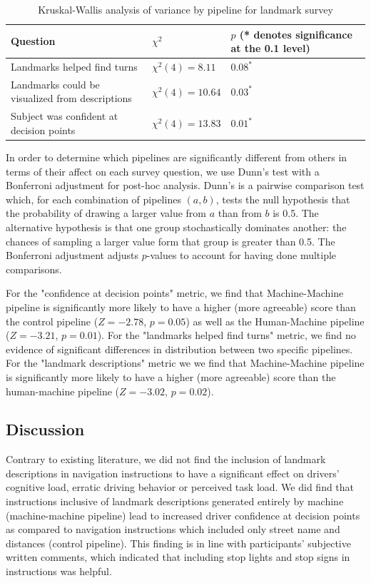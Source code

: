 \begin{table}[htbp]
  \centering
  \caption{Kruskal-Wallis analysis of variance by pipeline for landmark survey}
  \label{tab:likert}
  {\tabulinesep=2mm
    \begin{singlespace}
    \begin{tabu} to \textwidth{|X[c]|X[c]|X[c]|}
        \hline
         Question & $\chi^2$ & $p$ (* denotes significance at the 0.1 level) \\
        \hline\hline
        Landmarks helped find turns & $\chi^2(4) = 8.11$ & $0.08^*$ \\
        \hline
        Landmarks could be visualized from descriptions & $\chi^2(4) = 10.64$ & $0.03^*$ \\
        \hline
        Subject was confident at decision points & $\chi^2(4) = 13.83$ & $0.01^*$ \\
    \hline
    \end{tabu}
    \end{singlespace}
    }
\end{table}

In order to determine which pipelines are significantly different from others in terms of their affect on each survey question, we use Dunn's test with a Bonferroni adjustment for post-hoc analysis. Dunn's is a pairwise comparison test which, for each combination of pipelines $(a, b)$, tests the null hypothesis that the probability of drawing a larger value from $a$ than from $b$ is 0.5. The alternative hypothesis is that one group stochastically dominates another: the chances of sampling a larger value form that group is greater than 0.5. The Bonferroni adjustment adjusts $p$-values to account for having done multiple comparisons.

For the "confidence at decision points" metric, we find that Machine-Machine pipeline is significantly more likely to have a higher (more agreeable) score than the control pipeline ($Z=-2.78$, $p=0.05$) as well as the Human-Machine pipeline ($Z=-3.21$, $p=0.01$). For the "landmarks helped find turns" metric, we find no evidence of significant differences in distribution between two specific pipelines. For the "landmark descriptions" metric we we find that Machine-Machine pipeline is significantly more likely to have a higher (more agreeable) score than the human-machine pipeline ($Z=-3.02$, $p=0.02$).

\subsection{Discussion}
Contrary to existing literature, we did not find the inclusion of landmark descriptions in navigation instructions to have a significant effect on drivers' cognitive load, erratic driving behavior or perceived task load. We did find that instructions inclusive of landmark descriptions generated entirely by machine (machine-machine pipeline) lead to increased driver confidence at decision points as compared to navigation instructions which included only street name and distances (control pipeline). This finding is in line with participants' subjective written comments, which indicated that including stop lights and stop signs in instructions was helpful.

